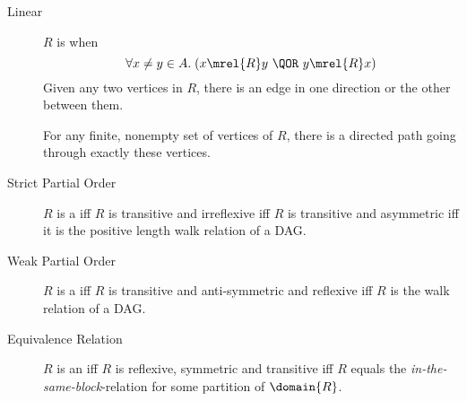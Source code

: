 \begin{description}
\item[Linear] $R$ is  when
\[
 \forall x \neq y \in A. \; (x \mrel{R} y\ \QOR\ y \mrel{R} x)
\]
Given any two vertices in $R$, there is an edge in one direction or the
other between them.

For any finite, nonempty set of vertices of $R$, there is a directed path
going through exactly these vertices.

\item[Strict Partial Order] $R$ is a  iff
  $R$ is transitive and irreflexive iff $R$ is transitive and
  asymmetric iff it is the positive length walk relation of a DAG.
  
\item[Weak Partial Order] $R$ is a  iff $R$ is
  transitive and anti-symmetric and reflexive iff $R$ is the walk
  relation of a DAG.

\item[Equivalence Relation] $R$ is an  iff $R$
  is reflexive, symmetric and transitive iff $R$ equals the
  \emph{in-the-same-block}-relation for some partition of $\domain{R}$.

\end{description}

\endinput

